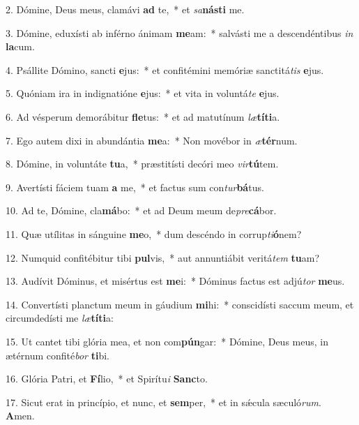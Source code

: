 2. Dómine, Deus meus, clamávi \textbf{ad} te,~*  et \textit{sa}\textbf{nás}\textbf{ti} me.\

3. Dómine, eduxísti ab inférno ánimam \textbf{me}am:~*  salvásti me a descendéntibus \textit{in} \textbf{la}cum.\

4. Psállite Dómino, sancti \textbf{e}jus:~*  et confitémini memóriæ sanctitá\textit{tis} \textbf{e}jus.\

5. Quóniam ira in indignatióne \textbf{e}jus:~*  et vita in voluntá\textit{te} \textbf{e}jus.\

6. Ad vésperum demorábitur \textbf{fle}tus:~*  et ad matutínum \textit{læ}\textbf{tí}\textbf{ti}a.\

7. Ego autem dixi in abundántia \textbf{me}a:~*  Non movébor in \textit{æ}\textbf{tér}num.\

8. Dómine, in voluntáte \textbf{tu}a,~*  præstitísti decóri meo \textit{vir}\textbf{tú}tem.\

9. Avertísti fáciem tuam \textbf{a} me,~*  et factus sum con\textit{tur}\textbf{bá}tus.\

10. Ad te, Dómine, cla\textbf{má}bo:~*  et ad Deum meum de\textit{pre}\textbf{cá}bor.\

11. Quæ utílitas in sánguine \textbf{me}o,~*  dum descéndo in corrup\textit{ti}\textbf{ó}nem?\

12. Numquid confitébitur tibi \textbf{pul}vis,~*  aut annuntiábit veritá\textit{tem} \textbf{tu}am?\

13. Audívit Dóminus, et misértus est \textbf{me}i:~*  Dóminus factus est adjú\textit{tor} \textbf{me}us.\

14. Convertísti planctum meum in gáudium \textbf{mi}hi:~*  conscidísti saccum meum, et circumdedísti me \textit{læ}\textbf{tí}\textbf{ti}a:\

15. Ut cantet tibi glória mea, et non com\textbf{pún}gar:~*  Dómine, Deus meus, in ætérnum confité\textit{bor} \textbf{ti}bi.\

16. Glória Patri, et \textbf{Fí}lio,~*  et Spirítu\textit{i} \textbf{Sanc}to.\

17. Sicut erat in princípio, et nunc, et \textbf{sem}per,~*  et in sǽcula sæculó\textit{rum}. \textbf{A}men.\

